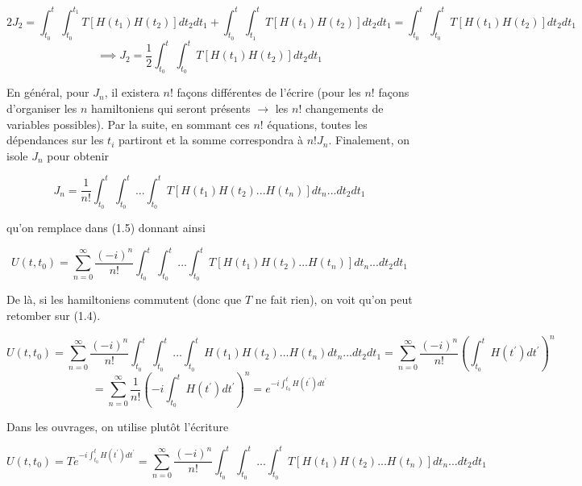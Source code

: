 \begin{equation*}
    2J_2 = \int_{t_0}^{t}\int_{t_0}^{t_1}T\left[H(t_1)H(t_2)\right]dt_2dt_1 + \int_{t_0}^{t}\int_{t_1}^{t}T\left[H(t_1)H(t_2)\right]dt_2dt_1 = \int_{t_0}^{t}\int_{t_0}^{t}T\left[H(t_1)H(t_2)\right]dt_2dt_1
\end{equation*}
\begin{equation}
    \implies J_2 = \frac{1}{2}\int_{t_0}^{t}\int_{t_0}^{t}T\left[H(t_1)H(t_2)\right]dt_2dt_1 
\end{equation}

En général, pour $J_n$, il existera $n!$ façons différentes de l'écrire (pour les $n!$ façons d'organiser les $n$ hamiltoniens qui seront présents $\rightarrow$ les $n!$ changements de variables possibles). Par la suite, en sommant ces $n!$ équations, toutes les dépendances sur les $t_i$ partiront et la somme correspondra à $n!J_n$. Finalement, on isole $J_n$ pour obtenir 

\begin{equation}
    J_n = \frac{1}{n!}\int_{t_0}^{t}\int_{t_0}^{t}...\int_{t_0}^{t} T \left[H(t_1)H(t_2)...H(t_n)\right]dt_n ... dt_2 dt_1
\end{equation}

qu'on remplace dans (1.5) donnant ainsi

\begin{equation*}
    U(t,t_0) = \sum_{n=0}^{\infty}\frac{(-i)^n}{n!}\int_{t_0}^{t}\int_{t_0}^{t}...\int_{t_0}^{t} T \left[H(t_1)H(t_2)...H(t_n)\right]dt_n ... dt_2 dt_1
\end{equation*}

De là, si les hamiltoniens commutent (donc que $T$ ne fait rien), on voit qu'on peut retomber sur (1.4).

\begin{equation*}
    U(t,t_0) = \sum_{n=0}^{\infty}\frac{(-i)^n}{n!}\int_{t_0}^{t}\int_{t_0}^{t}...\int_{t_0}^{t}H(t_1)H(t_2)...H(t_n)dt_n ... dt_2 dt_1 = \sum_{n=0}^{\infty}\frac{(-i)^n}{n!}\left(\int_{t_0}^{t}H(t^{'})dt^{'}\right)^n
\end{equation*}
\begin{equation*}
    = \sum_{n=0}^{\infty}\frac{1}{n!}\left(-i\int_{t_0}^{t}H(t^{'})dt^{'}\right)^n = e^{-i\int_{t_0}^{t}H(t^{'})dt^{'}}
\end{equation*}

Dans les ouvrages, on utilise plutôt l'écriture

\begin{equation}
    U(t,t_0) = Te^{-i\int_{t_0}^{t}H(t^{'})dt^{'}} = \sum_{n=0}^{\infty}\frac{(-i)^n}{n!}\int_{t_0}^{t}\int_{t_0}^{t}...\int_{t_0}^{t} T \left[H(t_1)H(t_2)...H(t_n)\right]dt_n ... dt_2 dt_1
\end{equation}

